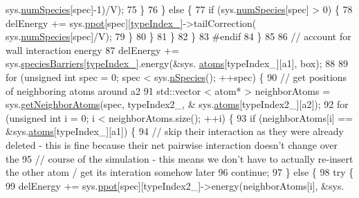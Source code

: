 \begin{DoxyCode}
      sys.\hyperlink{classsim_system_a9eea865e6dc1cff377b1e79c4d9c23f0}{numSpecies}[spec]-1)/V);
75                                 \}
76                     \} \textcolor{keywordflow}{else} \{
77                                 \textcolor{keywordflow}{if} (sys.\hyperlink{classsim_system_a9eea865e6dc1cff377b1e79c4d9c23f0}{numSpecies}[spec] > 0) \{
78                                     delEnergy += sys.\hyperlink{classsim_system_ad2e290b5963f132e6a3a56cee35c8e9f}{ppot}[spec][\hyperlink{classmc_move_acb731965547b0326ef318ec96da8b46a}{typeIndex\_}]->tailCorrection(
      sys.\hyperlink{classsim_system_a9eea865e6dc1cff377b1e79c4d9c23f0}{numSpecies}[spec]/V);
79                                 \}
80                     \}
81                 \}
82             \}
83 \textcolor{preprocessor}{#endif}
84 \textcolor{preprocessor}{}    \}
85 
86     \textcolor{comment}{// account for wall interaction energy}
87     delEnergy += sys.\hyperlink{classsim_system_a5ae652ff4519f39c3862abae32a9581b}{speciesBarriers}[\hyperlink{classmc_move_acb731965547b0326ef318ec96da8b46a}{typeIndex\_}].energy(&sys.
      \hyperlink{classsim_system_a90421b19082f7fb8fc23b7264b1161e4}{atoms}[typeIndex\_][a1], box);
88 
89         \textcolor{keywordflow}{for} (\textcolor{keywordtype}{unsigned} \textcolor{keywordtype}{int} spec = 0; spec < sys.\hyperlink{classsim_system_ab5e2e9b6204de15520302fe1d51688dd}{nSpecies}(); ++spec) \{
90             \textcolor{comment}{// get positions of neighboring atoms around a2}
91             std::vector < atom* > neighborAtoms = sys.\hyperlink{classsim_system_a9b3aeefa22c3b50b5913df6eea753bc6}{getNeighborAtoms}(spec, typeIndex2\_, &
      sys.\hyperlink{classsim_system_a90421b19082f7fb8fc23b7264b1161e4}{atoms}[typeIndex2\_][a2]);
92             \textcolor{keywordflow}{for} (\textcolor{keywordtype}{unsigned} \textcolor{keywordtype}{int} i = 0; i < neighborAtoms.size(); ++i) \{
93                 \textcolor{keywordflow}{if} (neighborAtoms[i] == &sys.\hyperlink{classsim_system_a90421b19082f7fb8fc23b7264b1161e4}{atoms}[typeIndex\_][a1]) \{
94                     \textcolor{comment}{// skip their interaction as they were already deleted - this is fine because their net
       pairwise interaction doesn't change over the}
95                     \textcolor{comment}{// course of the simulation - this means we don't have to actually re-insert the other
       atom / get its interation somehow later}
96                     \textcolor{keywordflow}{continue};
97                 \} \textcolor{keywordflow}{else} \{
98                 \textcolor{keywordflow}{try} \{
99                     delEnergy += sys.\hyperlink{classsim_system_ad2e290b5963f132e6a3a56cee35c8e9f}{ppot}[spec][typeIndex2\_]->energy(neighborAtoms[i], &sys.

\end{DoxyCode}

